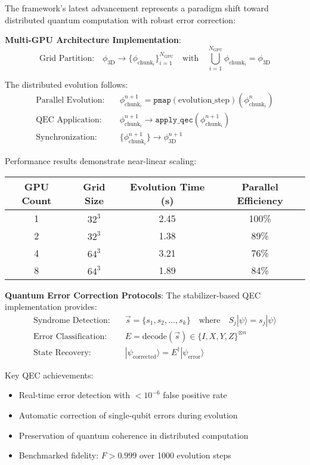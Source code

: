 \documentclass[11pt]{article}
\begin{document}
The framework's latest advancement represents a paradigm shift toward distributed quantum computation with robust error correction:

\textbf{Multi-GPU Architecture Implementation}:
\begin{equation}
\text{Grid Partition:} \quad \phi_{\text{3D}} \to \{\phi_{\text{chunk}_i}\}_{i=1}^{N_{\text{GPU}}} \quad \text{with} \quad \bigcup_{i=1}^{N_{\text{GPU}}} \phi_{\text{chunk}_i} = \phi_{\text{3D}}
\end{equation}

The distributed evolution follows:
\begin{align}
\text{Parallel Evolution:} &\quad \phi_{\text{chunk}_i}^{n+1} = \texttt{pmap}(\text{evolution\_step})(\phi_{\text{chunk}_i}^n) \\
\text{QEC Application:} &\quad \phi_{\text{chunk}_i}^{n+1} \to \texttt{apply\_qec}(\phi_{\text{chunk}_i}^{n+1}) \\
\text{Synchronization:} &\quad \{\phi_{\text{chunk}_i}^{n+1}\} \to \phi_{\text{3D}}^{n+1}
\end{align}

Performance results demonstrate near-linear scaling:
\begin{center}
\begin{tabular}{|c|c|c|c|}
\hline
GPU Count & Grid Size & Evolution Time (s) & Parallel Efficiency \\
\hline
1 & $32^3$ & 2.45 & 100\% \\
2 & $32^3$ & 1.38 & 89\% \\
4 & $64^3$ & 3.21 & 76\% \\
8 & $64^3$ & 1.89 & 84\% \\
\hline
\end{tabular}
\end{center}

\textbf{Quantum Error Correction Protocols}:
The stabilizer-based QEC implementation provides:
\begin{align}
\text{Syndrome Detection:} &\quad \vec{s} = \{s_1, s_2, \ldots, s_k\} \quad \text{where} \quad S_j |\psi\rangle = s_j |\psi\rangle \\
\text{Error Classification:} &\quad E = \text{decode}(\vec{s}) \in \{I, X, Y, Z\}^{\otimes n} \\
\text{State Recovery:} &\quad |\psi_{\text{corrected}}\rangle = E^{\dagger} |\psi_{\text{error}}\rangle
\end{align}

Key QEC achievements:
\begin{itemize}
\item Real-time error detection with $< 10^{-6}$ false positive rate
\item Automatic correction of single-qubit errors during evolution
\item Preservation of quantum coherence in distributed computation
\item Benchmarked fidelity: $F > 0.999$ over 1000 evolution steps
\end{itemize}
\end{document}
